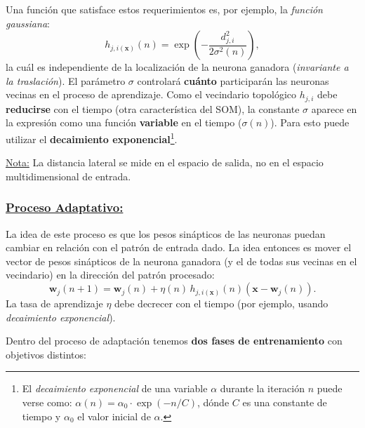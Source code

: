 \documentclass[10pt,a4paper]{article}
\begin{document}
Una función que satisface estos requerimientos es, por ejemplo, la \textit{función gaussiana}:
\[
h_{j,i(\mathbf{x})}(n) = \exp\left(-\frac{d_{j,i}^2}{2\sigma^2(n)}\right),
\]
la cuál es independiente de la localización de la neurona ganadora (\textit{invariante a la traslación}). El parámetro $\sigma$ controlará \textbf{cuánto} participarán las neuronas vecinas en el proceso de aprendizaje. Como el vecindario topológico $h_{j,i}$ debe \textbf{reducirse} con el tiempo (otra característica del SOM), la constante $\sigma$ aparece en la expresión como una función \textbf{variable} en el tiempo ($\sigma(n)$). Para esto puede utilizar el \textbf{decaimiento exponencial}\footnote{El \textit{decaimiento exponencial} de una variable $\alpha$ durante la iteración $n$ puede verse como: $\alpha(n) = \alpha_0 \cdot \exp(-n/C)$, dónde $C$ es una constante de tiempo y $\alpha_0$ el valor inicial de $\alpha$.}.

\underline{Nota:} La distancia lateral se mide en el espacio de salida, no en el espacio multidimensional de entrada.

\subsubsection*{\underline{Proceso Adaptativo:}}

La idea de este proceso es que los pesos sinápticos de las neuronas puedan cambiar en relación con el patrón de entrada dado. La idea entonces es mover el vector de pesos sinápticos de la neurona ganadora (y el de todas sus vecinas en el vecindario) en la dirección del patrón procesado:
\[
\mathbf{w}_j(n+1) = \mathbf{w}_j(n) + \eta(n)\,h_{j,i(\mathbf{x})}(n)(\mathbf{x}-\mathbf{w}_j(n)).
\]
La tasa	de aprendizaje $\eta$ debe decrecer con el tiempo (por ejemplo, usando \textit{decaimiento exponencial}).

Dentro del proceso de adaptación tenemos \textbf{dos fases de entrenamiento} con objetivos distintos:
\end{document}
